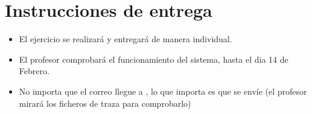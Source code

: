 \section{Instrucciones de entrega}
\begin{itemize}
\item El ejercicio se realizará y entregará de manera individual.
\item El profesor comprobará el funcionamiento del sistema, hasta el dia 14 de Febrero.
\item No importa que el correo llegue a , lo que importa es que se envíe (el profesor mirará los ficheros de traza para comprobarlo)
  
\end{itemize}

